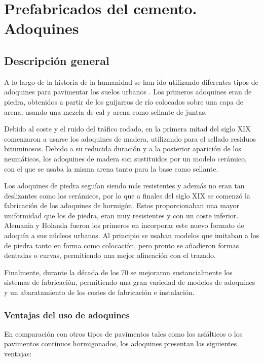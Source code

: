 \chapter{Prefabricados del cemento. Adoquines}
\section{Descripción general}
A lo largo de la historia de la humanidad se han ido utilizando diferentes tipos de adoquines para pavimentar los suelos urbanos \cite{eadmt04}. Los primeros adoquines eran de piedra, obtenidos a partir de los guijarros de río colocados sobre una capa de arena, usando una mezcla de cal y arena como sellante de juntas.

Debido al coste y el ruido del tráfico rodado, en la primera mitad del siglo XIX comenzaron a usarse los adoquines de madera, utilizando para el sellado residuos bituminosos. Debido a su reducida duración y a la posterior aparición de los neumáticos, los adoquines de madera son sustituidos por un modelo cerámico, con el que se usaba la misma arena tanto para la base como sellante.

Los adoquines de piedra seguían siendo más resistentes y además no eran tan deslizantes como los cerámicos, por lo que a finales del siglo XIX se comenzó la fabricación de los adoquines de hormigón. Estos proporcionaban una mayor uniformidad que los de piedra, eran muy resistentes y con un coste inferior. Alemania y Holanda fueron los primeros en incorporar este nuevo formato de adoquín a sus núcleos urbanos. Al principio se usaban modelos que imitaban a los de piedra tanto en forma como colocación, pero pronto se añadieron formas dentadas o curvas, permitiendo una mejor alineación con el trazado.

Finalmente, durante la década de los 70 se mejoraron sustancialmente los sistemas de fabricación, permitiendo una gran variedad de modelos de adoquines y un abaratamiento de los costes de fabricación e instalación.

\subsection{Ventajas del uso de adoquines}

En comparación con otros tipos de pavimentos tales como los asfálticos o los pavimentos contínuos hormigonados, los adoquines presentan las siguientes ventajas:

